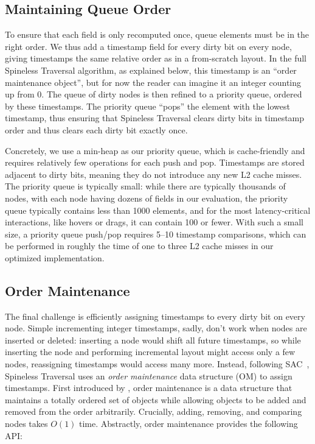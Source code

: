 \subsection{Maintaining Queue Order}

To ensure that each field is only recomputed once,
  queue elements must be in the right order.
We thus add a timestamp field
  for every dirty bit on every node,
  giving timestamps the same relative order
  as in a from-scratch layout.
In the full Spineless Traversal algorithm,
  as explained below,
  this timestamp is an ``order maintenance object'',
  but for now the reader can imagine it an integer counting up from 0.
The queue of dirty nodes is then refined to a priority queue,
  ordered by these timestamps.
The priority queue ``pops'' the element with the lowest timestamp,
  thus ensuring that Spineless Traversal clears dirty bits
  in timestamp order and thus clears each dirty bit exactly once.

Concretely, we use a min-heap as our priority queue,
  which is cache-friendly and requires
  relatively few operations for each push and pop.
Timestamps are stored adjacent to dirty bits,
  meaning they do not introduce any new L2 cache misses.
The priority queue is typically small:
  while there are typically thousands of nodes,
  with each node having dozens of fields in our evaluation,
  the priority queue typically contains less than 1000 elements,
  and for the most latency-critical interactions,
  like hovers or drags, it can contain 100 or fewer.
With such a small size, a priority queue push/pop requires
  5--10 timestamp comparisons,
  which can be performed in roughly the time
  of one to three L2 cache misses
  in our optimized implementation.

\subsection{Order Maintenance}

The final challenge is efficiently assigning timestamps
  to every dirty bit on every node.
Simple incrementing integer timestamps, sadly,
  don't work when nodes are inserted or deleted:
  inserting a node would shift all future timestamps,
  so while inserting the node and performing incremental layout
  might access only a few nodes,
  reassigning timestamps would access many more.
Instead, following SAC~\cite{SAC},
  Spineless Traversal uses
  an \emph{order maintenance} data structure (OM)
  to assign timestamps.
First introduced by \citet{OM},
  order maintenance is a data structure
  that maintains a totally ordered set of objects
  while allowing objects
  to be added and removed from the order arbitrarily.
Crucially, adding, removing, and comparing nodes takes $O(1)$ time.
Abstractly, order maintenance provides the following API:

